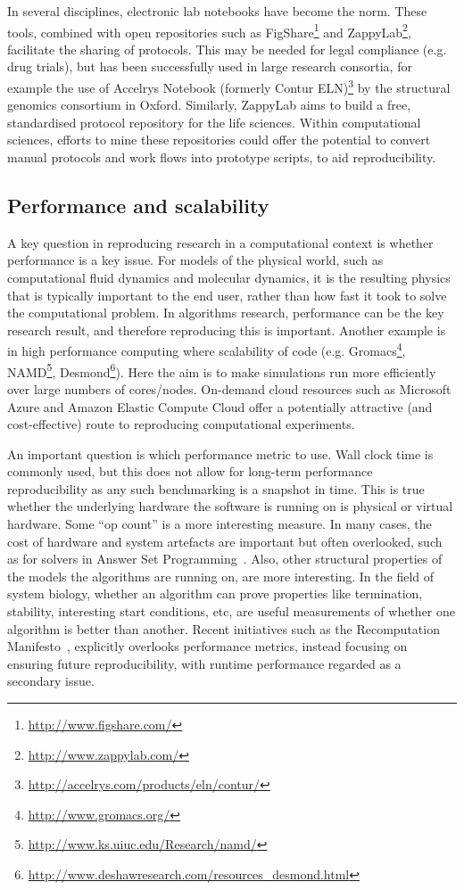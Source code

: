 \documentclass[conference]{IEEEtran}
\begin{document}
In several disciplines, electronic lab notebooks have become the
norm. These tools, combined with open repositories such as
FigShare\footnote{\url{http://www.figshare.com/}} and
ZappyLab\footnote{\url{http://www.zappylab.com/}}, facilitate the
sharing of protocols. This may be needed for legal compliance
(e.g. drug trials), but has been successfully used in large research
consortia, for example the use of Accelrys Notebook (formerly Contur
ELN)\footnote{\url{http://accelrys.com/products/eln/contur/}} by the
structural genomics consortium in Oxford. Similarly, ZappyLab aims to
build a free, standardised protocol repository for the life
sciences. Within computational sciences, efforts to mine these
repositories could offer the potential to convert manual protocols and
work flows into prototype scripts, to aid reproducibility.

\subsection{Performance and scalability}

A key question in reproducing research in a computational context is
whether performance is a key issue. For models of the physical world,
such as computational fluid dynamics and molecular dynamics, it is the
resulting physics that is typically important to the end user, rather
than how fast it took to solve the computational problem. In
algorithms research, performance can be the key research result, and
therefore reproducing this is important. Another example is in high
performance computing where scalability of code
(e.g. Gromacs\footnote{\url{http://www.gromacs.org/}},
NAMD\footnote{\url{http://www.ks.uiuc.edu/Research/namd/}},
Desmond\footnote{\url{http://www.deshawresearch.com/resources_desmond.html}}). Here
the aim is to make simulations run more efficiently over large numbers
of cores/nodes. On-demand cloud resources such as Microsoft Azure and
Amazon Elastic Compute Cloud offer a potentially attractive (and
cost-effective) route to reproducing computational experiments.

An important question is which performance metric to use. Wall clock
time is commonly used, but this does not allow for long-term
performance reproducibility as any such benchmarking is a snapshot in
time. This is true whether the underlying hardware the software is
running on is physical or virtual hardware. Some ``op count'' is a
more interesting measure. In many cases, the cost of hardware and
system artefacts are important but often overlooked, such as for
solvers in Answer Set Programming~\cite{brain+devos:2009}. Also, other
structural properties of the models the algorithms are running on, are
more interesting. In the field of system biology, whether an algorithm
can prove properties like termination, stability, interesting start
conditions, etc, are useful measurements of whether one algorithm is
better than another. Recent initiatives such as the Recomputation
Manifesto~\cite{gent:2013}, explicitly overlooks performance metrics,
instead focusing on ensuring future reproducibility, with runtime
performance regarded as a secondary issue.
\end{document}
